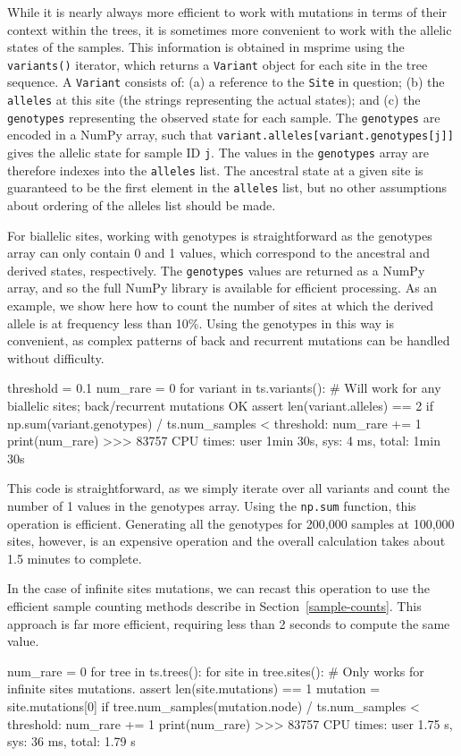 \documentclass[graybox]{svmult}
\begin{document}
While it is nearly always more efficient to work with mutations in terms
of their context within the trees, it is sometimes more convenient to
work with the allelic states of the samples. This information is
obtained in msprime using the \texttt{variants()} iterator, which
returns a \texttt{Variant} object for each site in the tree sequence. A
\texttt{Variant} consists of: (a) a reference to the \texttt{Site} in question;
(b) the \texttt{alleles} at this site (the strings representing the
actual states); and (c) the \texttt{genotypes} representing the observed
state for each sample. The \texttt{genotypes} are encoded in a NumPy
array, such that \texttt{variant.alleles{[}variant.genotypes{[}j{]}{]}}
gives the allelic state for sample ID \texttt{j}. The values in the
\texttt{genotypes} array are therefore indexes into the \texttt{alleles}
list. The ancestral state at a given site is guaranteed to be the first
element in the \texttt{alleles} list, but no other assumptions about
ordering of the alleles list should be made.

For biallelic sites, working with genotypes is straightforward as the
genotypes array can only contain 0 and 1 values, which correspond to
the ancestral and derived states, respectively. The \texttt{genotypes}
values are returned as a NumPy array, and so the full NumPy library is
available for efficient processing. As an example, we show here how to
count the number of sites at which the derived allele is at frequency
less than 10\%. Using the genotypes in this way is convenient, as
complex patterns of back and recurrent mutations can be handled without
difficulty.

\begin{pythoncode}
threshold = 0.1
num_rare = 0
for variant in ts.variants():
    # Will work for any biallelic sites; back/recurrent mutations OK
    assert len(variant.alleles) == 2
    if np.sum(variant.genotypes) / ts.num_samples < threshold:
        num_rare += 1
print(num_rare)
>>> 83757
CPU times: user 1min 30s, sys: 4 ms, total: 1min 30s
\end{pythoncode}

This code is straightforward, as we simply iterate over all variants and
count the number of 1 values in the genotypes array. Using the \texttt{np.sum}
function, this operation is efficient. Generating all the genotypes for
200,000 samples at 100,000 sites, however,
is an expensive operation and the overall calculation takes about 1.5 minutes
to complete.

In the case of infinite sites mutations, we can recast this operation
to use the efficient sample counting methods describe in
Section~\ref{sample-counts}. This approach is far more
efficient, requiring less than 2 seconds to compute the same value.
\begin{pythoncode}
num_rare = 0
for tree in ts.trees():
    for site in tree.sites():
        # Only works for infinite sites mutations.
        assert len(site.mutations) == 1
        mutation = site.mutations[0]
        if tree.num_samples(mutation.node) / ts.num_samples < threshold:
            num_rare += 1
print(num_rare)
>>> 83757
CPU times: user 1.75 s, sys: 36 ms, total: 1.79 s
\end{pythoncode}
\end{document}
